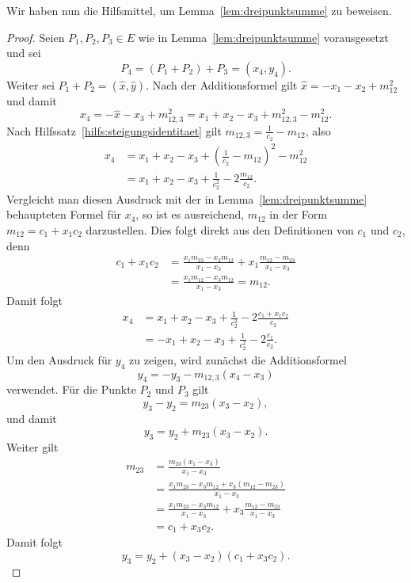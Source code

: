 Wir haben nun die Hilfsmittel, um Lemma~\ref{lem:dreipunktsumme} zu beweisen.
\begin{proof}
    Seien $P_1,P_2,P_3\in E$ wie in
    Lemma~\ref{lem:dreipunktsumme} vorausgesetzt und sei
    \[
        P_4=(P_1+P_2)+P_3=(x_4,y_4).
    \]
    Weiter sei $P_1+P_2=(\hat{x},\hat{y})$. Nach der Additionsformel gilt
    $\hat{x}=-x_1-x_2+m_{12}^2$ und damit
    \[
        x_4=-\hat{x}-x_3+m_{12,3}^2
        =x_1+x_2-x_3+m_{12,3}^2-m_{12}^2.
    \]
    Nach Hilfssatz~\ref{hilfs:steigungsidentitaet} gilt
    $m_{12,3}=\frac{1}{c_2}-m_{12}$, also
    \[
        \begin{aligned}
            x_4
             & =x_1+x_2-x_3+\left(\frac{1}{c_2}-m_{12}\right)^2-m_{12}^2 \\
             & =x_1+x_2-x_3+\frac{1}{c_2^2}-2\frac{m_{12}}{c_2}.
        \end{aligned}
    \]
    Vergleicht man diesen Ausdruck mit der in
    Lemma~\ref{lem:dreipunktsumme} behaupteten Formel für $x_4$, so ist es ausreichend, $m_{12}$ in der Form $m_{12}=c_1+x_1c_2$ darzustellen. Dies folgt direkt aus den Definitionen von $c_1$ und $c_2$, denn
    \[
        \begin{aligned}
            c_1+x_1c_2
             & =\frac{x_1m_{23}-x_3m_{12}}{x_1-x_3}
            +x_1\frac{m_{12}-m_{23}}{x_1-x_3}       \\
             & =\frac{x_1m_{12}-x_3m_{12}}{x_1-x_3}
            =m_{12}.
        \end{aligned}
    \]
    Damit folgt
    \[
        \begin{aligned}
            x_4
             & =x_1+x_2-x_3+\frac{1}{c_2^2}
            -2\frac{c_1+x_1c_2}{c_2}         \\
             & =-x_1+x_2-x_3+\frac{1}{c_2^2}
            -2\frac{c_1}{c_2}.
        \end{aligned}
    \]
    Um den Ausdruck für $y_4$ zu zeigen, wird zunächst die Additionsformel
    \[
        y_4=-y_3-m_{12,3}(x_4-x_3)
    \]
    verwendet. Für die Punkte $P_2$ und $P_3$ gilt
    \[
        y_3-y_2=m_{23}(x_3-x_2),
    \]
    und damit
    \[
        y_3=y_2+m_{23}(x_3-x_2).
    \]
    Weiter gilt
    \begin{align*}
        m_{23}
         & =\frac{m_{23}(x_1-x_3)}{x_1-x_3}                        \\
         & =\frac{x_1m_{23}-x_3m_{12}+x_3(m_{12}-m_{23})}{x_1-x_3} \\
         & =\frac{x_1m_{23}-x_3m_{12}}{x_1-x_3}
        +x_3\frac{m_{12}-m_{23}}{x_1-x_3}                          \\
         & =c_1+x_3c_2.
    \end{align*}
    Damit folgt
    \[
        y_3=y_2+(x_3-x_2)(c_1+x_3c_2).
    \]


\end{proof}
